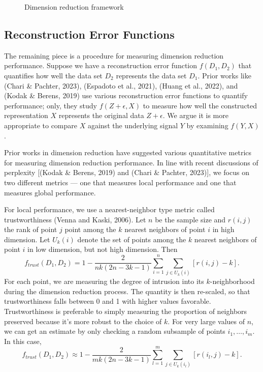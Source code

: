 \documentclass[webpdf,modern,large,namedate]{oup-authoring-template}
\theoremstyle{thmstyleone}%
\theoremstyle{thmstyletwo}%
\theoremstyle{thmstylethree}%
\begin{document}
\renewcommand{\thefigure}{1}
\begin{figure}[H]
\centering
{}
\caption{Dimension reduction framework}
\end{figure}

\subsection{Reconstruction Error Functions}
The remaining piece is a procedure for measuring dimension reduction performance. Suppose we have a reconstruction error function $f(D_1, D_2)$ that quantifies how well the data set $D_2$ represents the data set $D_1$. Prior works like (Chari \& Pachter, 2023), (Espadoto et al., 2021), (Huang et al., 2022), and (Kodak \& Berens, 2019) use various reconstruction error functions to quantify performance; only, they study $f(Z + \epsilon, X)$ to measure how well the constructed representation $X$ represents the original data $Z + \epsilon$. We argue it is more appropriate to compare $X$ against the underlying signal $Y$ by examining $f(Y, X)$.

Prior works in dimension reduction have suggested various quantitative metrics for measuring dimension reduction performance. In line with recent discussions of perplexity [(Kodak \& Berens, 2019) and (Chari \& Pachter, 2023)], we focus on two different metrics --- one that measures local performance and one that measures global performance.

For local performance, we use a nearest-neighbor type metric called trustworthiness (Venna and Kaski, 2006). Let $n$ be the sample size and $r(i,j)$ the rank of point $j$ point among the $k$ nearest neighbors of point $i$ in high dimension. Let $U_k(i)$ denote the set of points among the $k$ nearest neighbors of point $i$ in low dimension, but not high dimension. Then $$f_{trust}(D_1, D_2) = 1 - \frac{2}{nk(2n - 3k - 1)}\sum_{i=1}^n \sum_{j \in U_k(i)} \left[ r(i,j) - k \right].$$ For each point, we are measuring the degree of intrusion into its $k$-neighborhood during the dimension reduction process. The quantity is then re-scaled, so that trustworthiness falls between 0 and 1 with higher values favorable. Trustworthiness is preferable to simply measuring the proportion of neighbors preserved because it's more robust to the choice of $k$. For very large values of $n$, we can get an estimate by only checking a random subsample of points $i_1, \hdots, i_m$. In this case, $$f_{trust}(D_1, D_2) \approx 1 - \frac{2}{mk(2n - 3k - 1)}\sum_{l=1}^m \sum_{j \in U_k(i_l)} \left[ r(i_l,j) - k \right].$$
\end{document}
